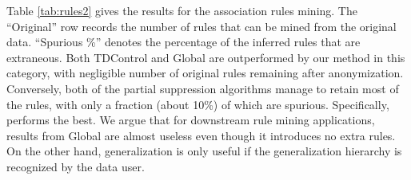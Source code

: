 Table \ref{tab:rules2} gives the results for the association rules mining.
The ``Original'' row records the number of rules that can be mined from the
original data. ``Spurious \%'' denotes the percentage of the inferred rules
that are extraneous. Both TDControl and Global are outperformed by our method
in this category, with negligible number of original rules remaining after
anonymization. Conversely, both of the partial suppression algorithms manage
to retain most of the rules, with only a fraction (about 10\%) of which are
spurious. Specifically, \psrule performs the best. We argue that for
downstream rule mining applications, results from Global are almost useless
even though it introduces no extra rules. On the other hand, generalization
is only useful if the generalization hierarchy is recognized by the data
user.


